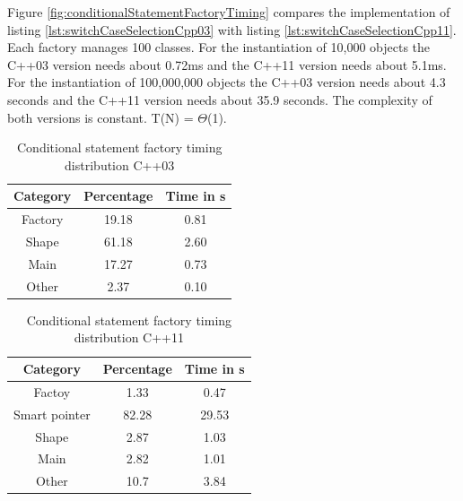 {\noindent Figure \ref{fig:conditionalStatementFactoryTiming} compares the implementation of listing \ref{lst:switchCaseSelectionCpp03} with listing \ref{lst:switchCaseSelectionCpp11}. Each factory manages 100 classes. For the instantiation of 10,000 objects the C++03 version needs about 0.72ms and the C++11 version needs about 5.1ms. For the instantiation of 100,000,000 objects the C++03 version needs about 4.3 seconds and the C++11 version needs about 35.9 seconds. %
The complexity of both versions is constant. T(N) = $\Theta$(1).
 
\begin{table}[h]\begin{center}
\begin{tabular}{|c|c|c|}\hline
\textbf{Category} & \textbf{Percentage} & \textbf{Time in s}\\
\hline
Factory & 19.18 & 0.81\\
\hline
Shape & 61.18 & 2.60\\
\hline
Main & 17.27 & 0.73\\
\hline
Other & 2.37 & 0.10\\
\hline
\end{tabular}
\caption{Conditional statement factory timing distribution C++03}
\label{tab:ConditionalStatementFactoryTimingDistributionCpp03}
\end{center}\end{table}

\begin{table}[h]\begin{center}
\begin{tabular}{|c|c|c|}\hline
\textbf{Category} & \textbf{Percentage} & \textbf{Time in s}\\
\hline
Factoy & 1.33 & 0.47\\
\hline
Smart pointer & 82.28 & 29.53\\
\hline
Shape & 2.87 & 1.03\\
\hline
Main & 2.82 & 1.01\\
\hline
Other & 10.7 & 3.84\\
\hline
\end{tabular}
\caption{Conditional statement factory timing distribution C++11}
\label{tab:ConditionalStatementFactoryTimingDistributionCpp11}
\end{center}\end{table}

\FloatBarrier 

}

